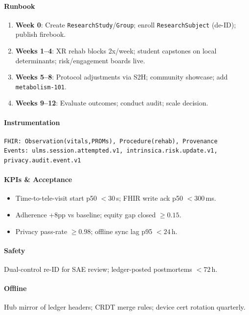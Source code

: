 \documentclass[11pt]{article}
\theoremstyle{plain}
\begin{document}
\paragraph{Runbook}
\begin{enumerate}
  \item \textbf{Week 0}: Create \texttt{ResearchStudy}/\texttt{Group}; enroll \texttt{ResearchSubject} (de-ID); publish firebook.
  \item \textbf{Weeks 1--4}: XR rehab blocks 2x/week; student capstones on local determinants; risk/engagement boards live.
  \item \textbf{Weeks 5--8}: Protocol adjustments via S2H; community showcase; add \texttt{metabolism-101}.
  \item \textbf{Weeks 9--12}: Evaluate outcomes; conduct audit; scale decision.
\end{enumerate}

\paragraph{Instrumentation}
\begin{verbatim}
FHIR: Observation(vitals,PROMs), Procedure(rehab), Provenance
Events: ulms.session.attempted.v1, intrinsica.risk.update.v1, privacy.audit.event.v1
\end{verbatim}

\paragraph{KPIs \& Acceptance}
\begin{itemize}
  \item Time-to-tele-visit start p50 $<30$\,s; FHIR write ack p50 $<300$\,ms.
  \item Adherence +8pp vs baseline; equity gap closed $\ge 0.15$.
  \item Privacy pass-rate $\ge 0.98$; offline sync lag p95 $<24$\,h.
\end{itemize}

\paragraph{Safety}
Dual-control re-ID for SAE review; ledger-posted postmortems $<72$\,h.

\paragraph{Offline}
Hub mirror of ledger headers; CRDT merge rules; device cert rotation quarterly.
\end{document}
